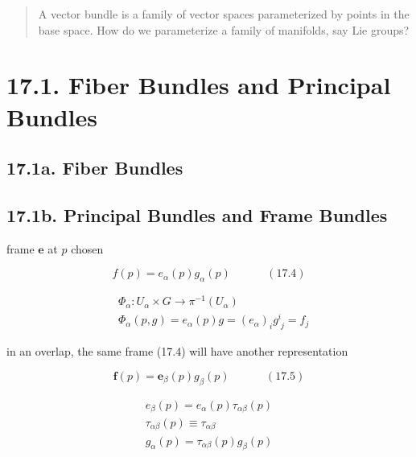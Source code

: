 
\begin{quote}
  A vector bundle is a family of vector spaces parameterized by points in the base space. How do we parameterize a family of manifolds, say Lie groups?
\end{quote}

\section{ 17.1. Fiber Bundles and Principal Bundles }

\subsection{ 17.1a. Fiber Bundles }

\subsection{ 17.1b. Principal Bundles and Frame Bundles }

frame $\mathbf{e}$ at $p$ chosen

\begin{equation}
  f(p) = e_{\alpha}(p) g_{\alpha}(p) \quad \quad \quad \, (17.4)
\end{equation}

\begin{equation}
\begin{aligned}
  & \Phi_{\alpha} : U_{\alpha} \times G \to \pi^{-1}(U_{\alpha}) \\ 
  & \Phi_{\alpha}(p,g) = e_{\alpha}(p) g = (e_{\alpha})_i g^i_{ \, \, j } = f_j
\end{aligned}
\end{equation}

in an overlap, the same frame (17.4) will have another representation

\begin{equation}
  \mathbf{f}(p) = \mathbf{e}_{\beta}{(p)} g_{\beta}(p) \quad \quad \quad \, (17.5)
\end{equation}

\[
\begin{gathered}
  e_{\beta}(p) = e_{\alpha}(p) \tau_{\alpha \beta}(p) \\ 
  \tau_{\alpha \beta}(p) \equiv \tau_{\alpha \beta} \\ 
  g_{\alpha}(p) = \tau_{\alpha \beta}(p) g_{\beta}(p)
\end{gathered}
\]

